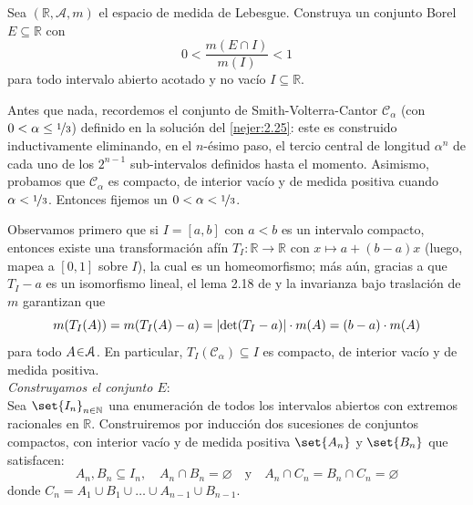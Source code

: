 
\setcounter{neje}{31}
\begin{nejer}
Sea $(\mathbb{R}, \mathcal{A}, m)$ el espacio de medida de Lebesgue. Construya un conjunto Borel $E \subseteq \mathbb{R}$ con
$$
0 < \frac{m(E \cap I)}{m(I)} < 1
$$
para todo intervalo abierto acotado y no vacío $I \subseteq \mathbb{R}$.
\end{nejer}
\begin{sol}
Antes que nada, recordemos el conjunto de Smith-Volterra-Cantor $\mathcal{C}_\alpha$ (con $0 < \alpha \leq \nicefrac{1}{3}$) definido en la solución del \cref{nejer:2.25}: este es construido inductivamente eliminando, en el $n$-ésimo paso, el tercio central de longitud $\alpha^n$ de cada uno de los $2^{n-1}$ sub-intervalos definidos hasta el momento. Asimismo, probamos que $\mathcal{C}_\alpha$ es compacto, de interior vacío y de medida positiva cuando $\alpha< \nicefrac{1}{3}$. Entonces fijemos un $0<\alpha<\nicefrac{1}{3}$.

Observamos primero que si $I=[a,b]$ con $a < b$ es un intervalo compacto, entonces existe una transformación afín $T_I \colon \mathbb{R} \to \mathbb{R}$ con $x \mapsto a+ (b-a)x$ (luego, mapea a $[0,1]$ sobre $I$), la cual es un homeomorfismo; más aún, gracias a que $T_I - a$ es un isomorfismo lineal, el lema 2.18 de \cite{Salamon} y la invarianza bajo traslación de $m$ garantizan que
\[
m(T_I(A)) = m(T_I(A) - a) = \abs{\det(T_I-a)} \cdot m(A) = (b-a)\cdot m(A)
\]
para todo $A \en\mathcal{A}$. En particular, $T_I(\mathcal{C}_{\alpha}) \subseteq I$ es compacto, de interior vacío y de medida positiva.
\vspace{1em}\\
\emph{Construyamos el conjunto $E$}:\\
Sea $\set{I_n}_{n\in\mathbb{N}}$ una enumeración de todos los intervalos abiertos con extremos racionales en $\mathbb{R}$. Construiremos por inducción dos sucesiones de conjuntos compactos, con interior vacío y de medida positiva $\set{A_n}$ y $\set{B_n}$ que satisfacen:
\[
A_n,B_n \subseteq I_n,\quad A_n \cap B_n = \varnothing \quad\text{y}\quad A_n \cap C_n = B_n \cap C_n = \varnothing
\]
donde $C_n = A_1\cup B_1 \cup \dots \cup A_{n-1} \cup B_{n-1}$.\par


\end{sol}

